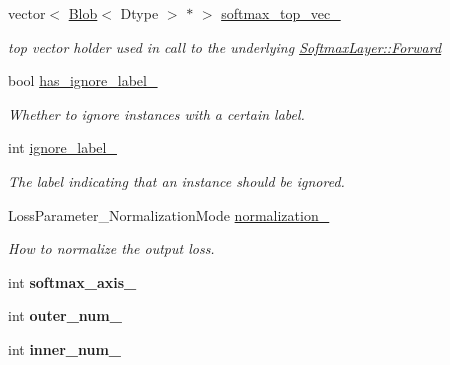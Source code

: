 \begin{DoxyCompactItemize}
vector$<$ \mbox{\hyperlink{classcaffe_1_1_blob}{Blob}}$<$ Dtype $>$ $\ast$ $>$ \mbox{\hyperlink{classcaffe_1_1_softmax_with_loss_layer_af8c7d82864973c19f3999325e09fd52c}{softmax\+\_\+top\+\_\+vec\+\_\+}}
\begin{DoxyCompactList}\small\item\em top vector holder used in call to the underlying \mbox{\hyperlink{classcaffe_1_1_layer_ab57d272dabe8c709d2a785eebe72ca57}{Softmax\+Layer\+::\+Forward}} \end{DoxyCompactList}\item 
\mbox{\label{classcaffe_1_1_softmax_with_loss_layer_ad77bc32fa576ad025102d29acf79aefb}} 
bool \mbox{\hyperlink{classcaffe_1_1_softmax_with_loss_layer_ad77bc32fa576ad025102d29acf79aefb}{has\+\_\+ignore\+\_\+label\+\_\+}}
\begin{DoxyCompactList}\small\item\em Whether to ignore instances with a certain label. \end{DoxyCompactList}\item 
\mbox{\label{classcaffe_1_1_softmax_with_loss_layer_a117d31c7ac538dd7851fb493bfc75d95}} 
int \mbox{\hyperlink{classcaffe_1_1_softmax_with_loss_layer_a117d31c7ac538dd7851fb493bfc75d95}{ignore\+\_\+label\+\_\+}}
\begin{DoxyCompactList}\small\item\em The label indicating that an instance should be ignored. \end{DoxyCompactList}\item 
\mbox{\label{classcaffe_1_1_softmax_with_loss_layer_a4b1fa348fc885339931f132573467b81}} 
Loss\+Parameter\+\_\+\+Normalization\+Mode \mbox{\hyperlink{classcaffe_1_1_softmax_with_loss_layer_a4b1fa348fc885339931f132573467b81}{normalization\+\_\+}}
\begin{DoxyCompactList}\small\item\em How to normalize the output loss. \end{DoxyCompactList}\item 
\mbox{\label{classcaffe_1_1_softmax_with_loss_layer_a700e28793c5b187de36b935744f5785c}} 
int {\bfseries softmax\+\_\+axis\+\_\+}
\item 
\mbox{\label{classcaffe_1_1_softmax_with_loss_layer_aaabb753438f6877c7a61a52b56b19a1d}} 
int {\bfseries outer\+\_\+num\+\_\+}
\item 
\mbox{\label{classcaffe_1_1_softmax_with_loss_layer_a1fb0bb2aa77585f49be951062c82a9fd}} 
int {\bfseries inner\+\_\+num\+\_\+}
\end{DoxyCompactItemize}


